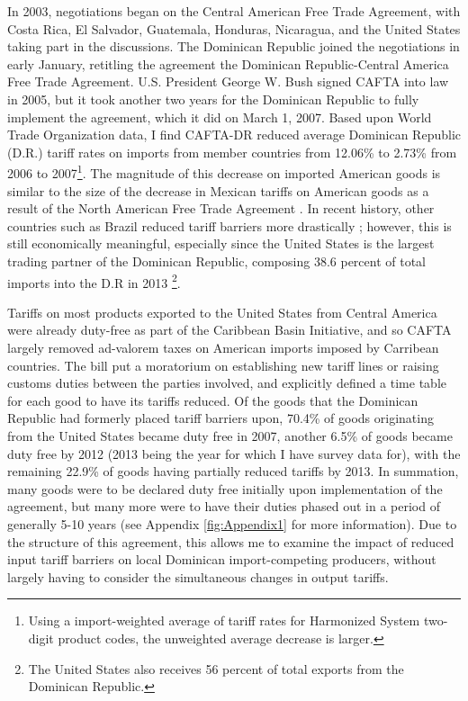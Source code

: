 \documentclass[12pt]{article}
\begin{document}
In 2003, negotiations began on the Central American Free Trade Agreement, with Costa Rica, El 
Salvador, Guatemala, Honduras, Nicaragua, and the United States taking part in the discussions. The 
Dominican Republic joined the negotiations in early January, retitling the agreement the Dominican 
Republic-Central America Free Trade Agreement. U.S. President George W. 
Bush signed CAFTA into law in 2005, but it took another two years for the 
Dominican Republic to fully implement the agreement, which it did on March 1, 2007.
Based upon World Trade Organization data,
I find CAFTA-DR reduced average Dominican 
Republic (D.R.) tariff rates on imports from member countries from 12.06\% to 2.73\% from 2006 to 
2007\footnote{Using a import-weighted average
of tariff rates for Harmonized System two-digit product codes, 
the unweighted average decrease is larger.}. The magnitude of this decrease on imported American
goods is similar to the size of the decrease in Mexican tariffs on American goods as a result of the
North American Free Trade Agreement \citep{goldberg}. 
In recent history, other countries such as Brazil reduced tariff barriers more drastically
\citep{kovak}; however, this is still economically meaningful, especially since the United States 
is the largest trading partner of the Dominican Republic, composing 
38.6 percent of  total imports into the D.R in 2013 \citep{wtocountry}\footnote{The 
United States also receives 56 percent of total exports from the Dominican Republic.}.

Tariffs on most products exported to the United States from Central America were 
already duty-free as part of the Caribbean Basin Initiative, and so CAFTA largely 
removed ad-valorem taxes on American imports imposed by Carribean countries. 
The bill put a moratorium on establishing new tariff lines or raising customs 
duties between the parties involved, and explicitly defined a time table for each good to have its 
tariffs reduced. Of the goods that the Dominican Republic had formerly placed tariff barriers upon,
70.4\% of goods originating from the United States became duty free in 2007, another 6.5\%
of goods became duty free by 2012 (2013 being the year for which I have survey data for), with
the remaining 22.9\% of goods having partially reduced tariffs by 2013.
In summation, many goods were to be declared duty free initially upon implementation of the agreement, 
but many more were to have their duties phased out in a period of generally 5-10 years 
(see Appendix \ref{fig:Appendix1} for more information). Due to the structure of this agreement,
this allows me to examine the impact of reduced input tariff barriers on local 
Dominican import-competing producers, without largely having to consider the simultaneous 
changes in output tariffs.
\end{document}
